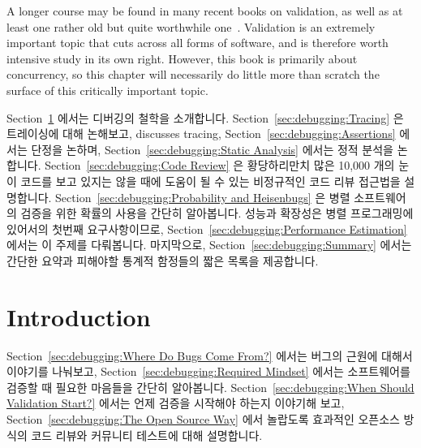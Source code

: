 A longer course may be found in many recent books on validation, as
well as at least one rather old but quite worthwhile
one~\cite{GlenfordJMyers1979}.
Validation is an extremely important topic that cuts across all forms
of software, and is therefore worth intensive study in its own right.
However, this book is primarily about concurrency, so this chapter
will necessarily do little more than scratch the surface of this
critically important topic.
\fi

Section~\ref{sec:debugging:Introduction}
에서는 디버깅의 철학을 소개합니다.
Section~\ref{sec:debugging:Tracing}
은 트레이싱에 대해 논해보고,
discusses tracing,
Section~\ref{sec:debugging:Assertions}
에서는 단정을 논하며,
Section~\ref{sec:debugging:Static Analysis}
에서는 정적 분석을 논합니다.
Section~\ref{sec:debugging:Code Review}
은 황당하리만치 많은 10,000 개의 눈이 코드를 보고 있지는 않을 때에 도움이 될 수
있는 비정규적인 코드 리뷰 접근법을 설명합니다.
Section~\ref{sec:debugging:Probability and Heisenbugs}
은 병렬 소프트웨어의 검증을 위한 확률의 사용을 간단히 알아봅니다.
성능과 확장성은 병렬 프로그래밍에 있어서의 첫번째 요구사항이므로,
Section~\ref{sec:debugging:Performance Estimation} 에서는 이 주제를 다뤄봅니다.
마지막으로,
Section~\ref{sec:debugging:Summary}
에서는 간단한 요약과 피해야할 통계적 함정들의 짧은 목록을 제공합니다.

\section{Introduction}
\label{sec:debugging:Introduction}

Section~\ref{sec:debugging:Where Do Bugs Come From?}
에서는 버그의 근원에 대해서 이야기를 나눠보고,
Section~\ref{sec:debugging:Required Mindset}
에서는 소프트웨어를 검증할 때 필요한 마음들을 간단히 알아봅니다.
Section~\ref{sec:debugging:When Should Validation Start?}
에서는 언제 검증을 시작해야 하는지 이야기해 보고,
Section~\ref{sec:debugging:The Open Source Way} 에서 놀랍도록 효과적인 오픈소스
방식의 코드 리뷰와 커뮤니티 테스트에 대해 설명합니다.
\iffalse

